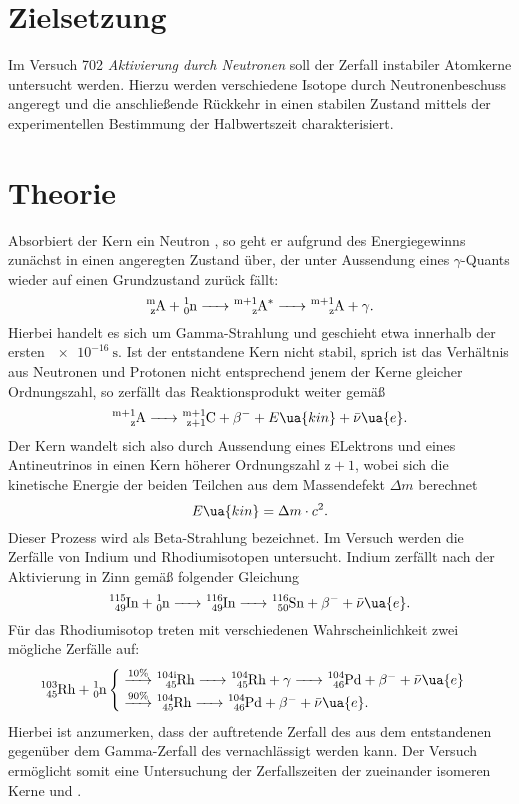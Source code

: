 \setcounter{page}{1}
\section*{Zielsetzung}
Im Versuch 702 \textit{Aktivierung durch Neutronen} soll der Zerfall instabiler Atomkerne untersucht werden.
Hierzu werden verschiedene Isotope durch Neutronenbeschuss angeregt und die anschließende Rückkehr in einen
stabilen Zustand mittels der experimentellen Bestimmung der Halbwertszeit charakterisiert.
\section{Theorie}
Absorbiert der Kern  ein Neutron , so geht er aufgrund des Energiegewinns
zunächst in einen angeregten Zustand über, der unter Aussendung eines $\gamma$-Quants wieder
auf einen Grundzustand zurück fällt:
\begin{equation}
  \ce{^m_z A + ^1_0 n -> ^{m+1}_z A^* -> ^{m+1}_z A }+ \gamma.
\end{equation}
Hierbei handelt es sich um Gamma-Strahlung und geschieht etwa innerhalb der ersten $\SI{e-16}{\second}$.
Ist der entstandene Kern 
nicht stabil, sprich ist das Verhältnis aus Neutronen und Protonen nicht entsprechend jenem der Kerne
gleicher Ordnungszahl, so zerfällt das Reaktionsprodukt weiter gemäß
\begin{equation}
  \ce{^{m+1}_z A -> ^{m+1}_{z+1} C }+ \beta^{-} + E\ua{kin} + \bar{\nu}\ua{e}.
\end{equation}
Der Kern wandelt sich also durch Aussendung eines ELektrons und eines Antineutrinos in einen Kern höherer Ordnungszahl $\mathup{z} + 1$, wobei
sich die kinetische Energie der beiden Teilchen aus dem Massendefekt $\Delta m$ berechnet
\begin{equation}
  E\ua{kin} = \Delta m \cdot c^2.
\end{equation}
Dieser Prozess wird als Beta-Strahlung bezeichnet. Im Versuch werden die Zerfälle von Indium und Rhodiumisotopen untersucht.
Indium zerfällt nach der Aktivierung in Zinn gemäß folgender Gleichung
\begin{equation}
  \ce{^115_49 In + ^1_0 n ->^116_49 In -> ^116_50 Sn} + \beta^- + \bar{\nu}\ua{e}.
\end{equation}
Für das Rhodiumisotop treten mit verschiedenen Wahrscheinlichkeit zwei mögliche Zerfälle auf:
\begin{equation}
\ce{^103_45 Rh + ^1_0 n} \begin{cases}
\overset{10\%}{\ce{->}} \ce{^{104i}_45 Rh -> ^{104}_45 Rh} + \gamma \ce{-> ^104_46 Pd} +  \beta^- + \bar{\nu}\ua{e}\\
\overset{90\%}{\ce{->}} \ce{^{104}_45 Rh ->  ^104_46 Pd} +  \beta^- + \bar{\nu}\ua{e}.
\end{cases}
\end{equation}
Hierbei ist anzumerken, dass der auftretende Zerfall des aus dem  entstandenen  gegenüber dem
Gamma-Zerfall des  vernachlässigt werden kann. Der Versuch ermöglicht somit eine Untersuchung der Zerfallszeiten
der zueinander isomeren Kerne  und .

